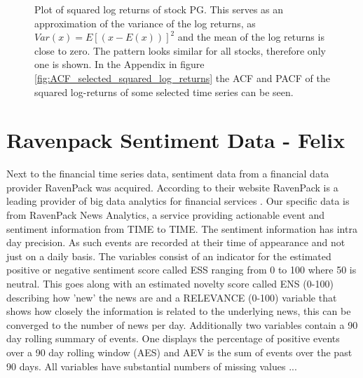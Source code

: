 \begin{figure}[h!]
    \centering
    \begin{adjustbox}{width=.95\textwidth,center}
    
    \end{adjustbox}  
    \caption{Plot of squared log returns of stock PG. This serves as an approximation of the variance of the log returns, as $Var(x) = E [(x - E(x))]^2$ and the mean of the log returns is close to zero. The pattern looks similar for all stocks, therefore only one is shown. In the Appendix in figure \ref{fig:ACF_selected_squared_log_returns} the ACF and PACF of the squared log-returns of some selected time series can be seen.}
    \label{fig:PG_squared_log_returns}
\end{figure}{}








\section{Ravenpack Sentiment Data - Felix}
Next to the financial time series data, sentiment data from a financial data provider RavenPack was acquired. According to their website RavenPack is a leading provider of big data analytics for financial services \citep{RavenPack}. Our specific data is from RavenPack News Analytics, a service providing actionable event and sentiment information from TIME to TIME. The sentiment information has intra day precision. As such events are recorded at their time of appearance and not just on a daily basis. The variables consist of an indicator for the estimated positive or negative sentiment score called ESS ranging from 0 to 100 where 50 is neutral. This goes along with an estimated novelty score called ENS (0-100) describing how 'new' the news are and a RELEVANCE (0-100) variable that shows how closely the information is related to the underlying news, this can be converged to the number of news per day. Additionally two variables contain a 90 day rolling summary of events. One displays the percentage of positive events over a 90 day rolling window (AES) and AEV is the sum of events over the past 90 days. All variables have substantial numbers of missing values ...


